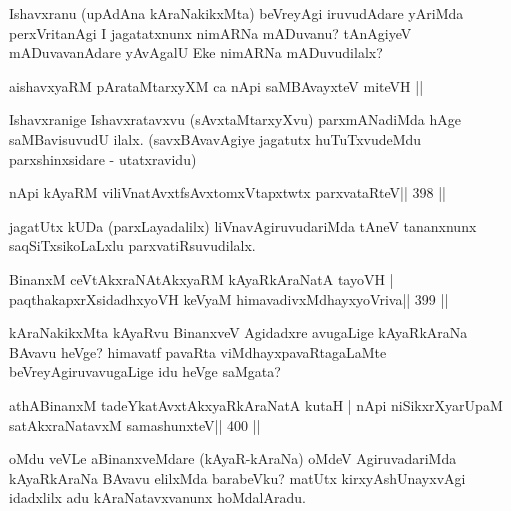 \begin{artha}
Ishavxranu (upAdAna kAraNakikxMta) beVreyAgi iruvudAdare yAriMda perxVritanAgi I jagatatxnunx nimARNa mADuvanu? tAnAgiyeV mADuvavanAdare yAvAgalU Eke nimARNa mADuvudilalx?
\end{artha}


\begin{shl}
aishavxyaRM pArataMtarxyXM ca nApi saMBAvayxteV miteVH ||
\end{shl}

\begin{artha}
Ishavxranige Ishavxratavxvu (sAvxtaMtarxyXvu) parxmANadiMda hAge saMBavisuvudU ilalx. (savxBAvavAgiye jagatutx huTuTxvudeMdu parxshinxsidare - utatxravidu)
\end{artha}

\begin{shl}
nApi kAyaRM viliVnatAvxtfsAvxtomxVtapxtwtx parxvataRteV\hfill || 398 ||
\end{shl}

\begin{artha}
jagatUtx kUDa (parxLayadalilx) liVnavAgiruvudariMda tAneV tananxnunx saqSiTxsi\-koLaLxlu parxvatiRsuvudilalx.
\end{artha}


\begin{shl}
BinanxM ceVtAkxraNAtAkxyaRM kAyaRkAraNatA tayoVH |
paqthakapxrXsidadhxyoVH keVyaM himavadivxMdhayxyoVriva|| 399 ||
\end{shl}

\begin{artha}
kAraNakikxMta kAyaRvu BinanxveV Agidadxre avugaLige kAyaRkAraNa BAvavu heVge? himavatf pavaRta viMdhayxpavaRtagaLaMte beVreyAgiruvavugaLige idu heVge saMgata?
\end{artha}


\begin{shl}
athABinanxM tadeYkatAvxtAkxyaRkAraNatA kutaH |
nApi niSikxrXyarUpaM satAkxraNatavxM samashunxteV\hfill || 400 ||
\end{shl}

\begin{artha}
oMdu veVLe aBinanxveMdare (kAyaR-kAraNa) oMdeV AgiruvadariMda kAyaRkAraNa BAvavu elilxMda barabeVku? matUtx kirxyAshUnayxvAgi idadxlilx adu kAraNatavxvanunx hoMdalAradu.
\end{artha}

